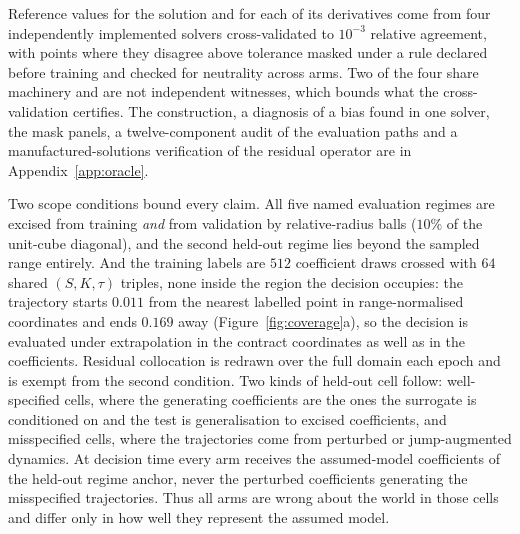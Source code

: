 \documentclass{article}
\begin{document}
Reference values for the solution and for each of its derivatives come from four
independently implemented solvers cross-validated to $10^{-3}$ relative agreement,
with points where they disagree above tolerance masked under a rule declared before
training and checked for neutrality across arms. Two of the four share machinery and
are not independent witnesses, which bounds what the cross-validation certifies. The construction, a diagnosis of a bias found in one solver, the mask panels, a
twelve-component audit of the evaluation paths and a manufactured-solutions
verification of the residual operator are in Appendix~\ref{app:oracle}.

Two scope conditions bound every claim. All five named evaluation regimes are
excised from training \emph{and} from validation by relative-radius balls ($10\%$ of
the unit-cube diagonal), and the second held-out regime lies beyond the sampled
range entirely. And the training labels are $512$ coefficient draws crossed with
$64$ shared $(S,K,\tau)$ triples, none inside the region the decision occupies: the
trajectory starts $0.011$ from the nearest labelled point in range-normalised
coordinates and ends $0.169$ away (Figure~\ref{fig:coverage}a), so the decision is
evaluated under extrapolation in the contract coordinates as well as in the
coefficients. Residual collocation is redrawn over the full domain each epoch and is
exempt from the second condition. Two kinds of held-out cell follow: well-specified cells, where the generating
coefficients are the ones the surrogate is conditioned on and the test is
generalisation to excised coefficients, and misspecified cells, where the
trajectories come from perturbed or jump-augmented dynamics. At decision time every
arm receives the assumed-model coefficients of the held-out regime anchor, never
the perturbed coefficients generating the misspecified trajectories. Thus all arms
are wrong about the world in those cells and differ only in how well they represent
the assumed model.
\end{document}
